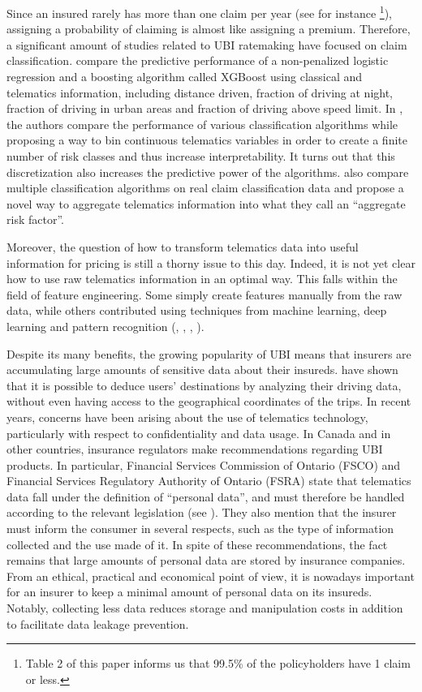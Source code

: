 \documentclass{article}
\begin{document}
Since an insured rarely has more than one claim per year (see for instance \cite{boucher2007risk}\footnote{Table 2 of this paper informs us that 99.5\% of the policyholders have 1 claim or less.}), assigning a probability of claiming is almost like assigning a premium. Therefore, a significant amount of studies related to UBI ratemaking have focused on claim classification. \cite{pesantez2019predicting} compare the predictive performance of a non-penalized logistic regression and a boosting algorithm called XGBoost using classical and telematics information, including distance driven, fraction of driving at night, fraction of driving in urban areas and fraction of driving above speed limit. In \cite{huang2019automobile}, the authors compare the performance of various classification algorithms while proposing a way to bin continuous telematics variables in order to create a finite number of risk classes and thus increase interpretability. It turns out that this discretization also increases the predictive power of the algorithms. \cite{paefgen2013evaluation} also compare multiple classification algorithms on real claim classification data and propose a novel way to aggregate telematics information into what they call an ``aggregate risk factor''.

Moreover, the question of how to transform telematics data into useful information for pricing is still a thorny issue to this day. Indeed, it is not yet clear how to use raw telematics information in an optimal way. This falls within the field of feature engineering. Some simply create features manually from the raw data, while others contributed using techniques from machine learning, deep learning and pattern recognition (\cite{weidner2016classification}, \cite{gao2018feature}, \cite{gao2018driving}, \cite{gao2019convolutional}).

Despite its many benefits, the growing popularity of UBI means that insurers are accumulating large amounts of sensitive data about their insureds. \cite{dewri2013inferring} have shown that it is possible to deduce users' destinations by analyzing their driving data, without even having access to the geographical coordinates of the trips. In recent years, concerns have been arising about the use of telematics technology, particularly with respect to confidentiality and data usage. In Canada and in other countries, insurance regulators make recommendations regarding UBI products. In particular, Financial Services Commission of Ontario (FSCO) and Financial Services Regulatory Authority of Ontario (FSRA) state that telematics data fall under the definition of ``personal data'', and must therefore be handled according to the relevant legislation (see \cite{howell2013}). They also mention that the insurer must inform the consumer in several respects, such as the type of information collected and the use made of it. In spite of these recommendations, the fact remains that large amounts of personal data are stored by insurance companies. From an ethical, practical and economical point of view, it is nowadays important for an insurer to keep a minimal amount of personal data on its insureds. Notably, collecting less data reduces storage and manipulation costs in addition to facilitate data leakage prevention.
\end{document}
